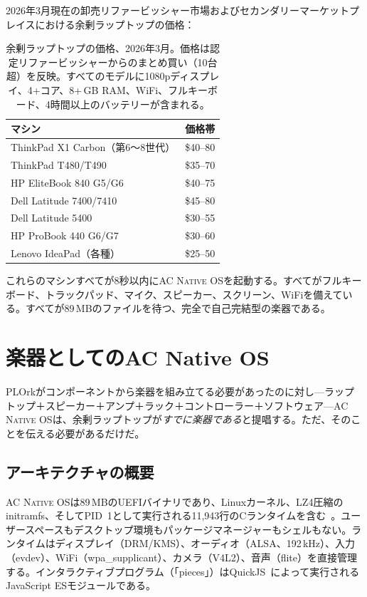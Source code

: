 \documentclass[10pt,letterpaper,twocolumn]{article}
\newcommand{\acos}{\textsc{AC Native OS}}
\begin{document}
2026年3月現在の卸売リファービッシャー市場およびセカンダリーマーケットプレイスにおける余剰ラップトップの価格：

\begin{table}[h]
\small
\centering
\begin{tabular}{lr}
\toprule
\textbf{マシン} & \textbf{価格帯} \\
\midrule
ThinkPad X1 Carbon（第6〜8世代） & \$40--80 \\
ThinkPad T480/T490 & \$35--70 \\
HP EliteBook 840 G5/G6 & \$40--75 \\
Dell Latitude 7400/7410 & \$45--80 \\
Dell Latitude 5400 & \$30--55 \\
HP ProBook 440 G6/G7 & \$30--60 \\
Lenovo IdeaPad（各種） & \$25--50 \\
\bottomrule
\end{tabular}
\caption{余剰ラップトップの価格、2026年3月。価格は認定リファービッシャーからのまとめ買い（10台超）を反映。すべてのモデルに1080pディスプレイ、4+コア、8+\,GB RAM、WiFi、フルキーボード、4時間以上のバッテリーが含まれる。}
\label{tab:surplus}
\end{table}

これらのマシンすべてが8秒以内に\acos{}を起動する。すべてがフルキーボード、トラックパッド、マイク、スピーカー、スクリーン、WiFiを備えている。すべてが89\,MBのファイルを待つ、完全で自己完結型の楽器である。


\section{楽器としてのAC Native OS}
\label{sec:instrument}

PLOrkがコンポーネントから楽器を組み立てる必要があったのに対し---ラップトップ＋スピーカー＋アンプ＋ラック＋コントローラー＋ソフトウェア---\acos{}は、余剰ラップトップが\emph{すでに楽器である}と提唱する。ただ、そのことを伝える必要があるだけだ。

\subsection{アーキテクチャの概要}

\acos{}は89\,MBのUEFIバイナリであり、Linuxカーネル、LZ4圧縮のinitramfs、そしてPID~1として実行される11,943行のCランタイムを含む~\citep{scudder2026os}。ユーザースペースもデスクトップ環境もパッケージマネージャーもシェルもない。ランタイムはディスプレイ（DRM/KMS）、オーディオ（ALSA、192\,kHz）、入力（evdev）、WiFi（wpa\_supplicant）、カメラ（V4L2）、音声（flite）を直接管理する。インタラクティブプログラム（「pieces」）はQuickJS~\citep{bellard2019quickjs}によって実行されるJavaScript ESモジュールである。
\end{document}
